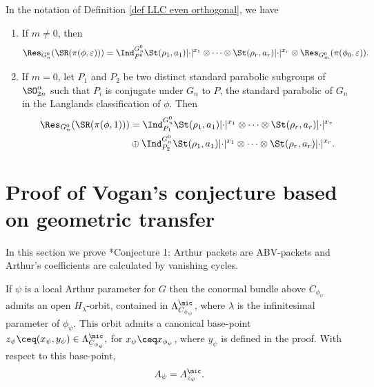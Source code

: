 \documentclass[11pt,letterpaper]{amsart}
\numberwithin{equation}{section}
\begin{document}
\begin{lemma}\label{lem restriction of std mod even orthogonal}
    In the notation of Definition \ref{def LLC even orthogonal}, we have 
    \begin{enumerate}
        \item If $m\neq 0$, then 
        \[ \Res_{G_n^0} ( \SR(\pi(\phi,\varepsilon)))= \Ind_{P^0}^{G_n^0}  \St(\rho_1,a_1)\lvert\cdot\rvert^{x_1} \otimes \cdots \otimes \St(\rho_r,a_r)\lvert\cdot\rvert^{x_r} \otimes \Res_{G_m^0} (\pi(\phi_0, \varepsilon)). \]
        \item If $m=0$, let $P_1$ and $P_2$ be two distinct standard parabolic subgroups of $\SO_{2n}^{\alpha}$ such that $P_i$ is conjugate under $G_n$ to $P$, the standard parabolic of $G_n$ in the Langlands classification of $\phi$. Then
        \begin{align*}
            \Res_{G_n^0} ( \SR(\pi(\phi,1)))&= \Ind_{P_1}^{G_n^0}  \St(\rho_1,a_1)\lvert\cdot\rvert^{x_1} \otimes \cdots \otimes \St(\rho_r,a_r)\lvert\cdot\rvert^{x_r} \\
      &  \oplus \Ind_{P_2}^{G_n^0}  \St(\rho_1,a_1)\lvert\cdot\rvert^{x_1} \otimes \cdots \otimes \St(\rho_r,a_r)\lvert\cdot\rvert^{x_r} . 
        \end{align*} 
    \end{enumerate}
\end{lemma}




\section{Proof of Vogan's conjecture based on geometric transfer}\label{section: endoclassical}

In this section we prove \cite{CFMMX22}*{Conjecture 1}: Arthur packets are ABV-packets and Arthur's coefficients are calculated by vanishing cycles.


\begin{proposition}
    If $\psi$ is a local Arthur parameter for $G$ then the conormal bundle above $C_{\phi_\psi}$ admits an open $H_\lambda$-orbit, contained in $\Lambda^\mic_{C_{\phi_\psi}}$, where $\lambda$ is the infinitesimal parameter of $\phi_\psi$.
    This orbit admits a canonical base-point $
    z_\psi \ceq (x_\psi,y_\psi) \in \Lambda^\mic_{C_{\phi_\psi}},
    $
    for $x_\psi \ceq x_{\phi_\psi}$, where $y_\psi$ is defined in the proof. 
    With respect to this base-point, 
    \[
    A_\psi =  A^\mic_{z_\psi}.
    \]
\end{proposition}
\end{document}
